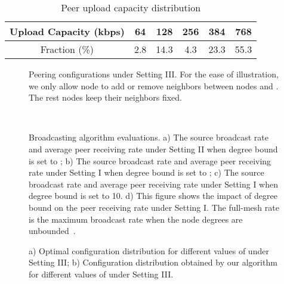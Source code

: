 \documentclass[10pt,conference]{IEEEtran}
\begin{document}
\begin{table}
\caption{Peer upload capacity distribution}


\label{tab:distrib}

\centering{}\begin{tabular}{|c|c|c|c|c|c|}
\hline
Upload Capacity (kbps)  & 64  & 128  & 256  & 384  & 768 \tabularnewline
\hline
Fraction (\%)  & 2.8  & 14.3  & 4.3  & 23.3  & 55.3 \tabularnewline
\hline
\end{tabular}
\end{table}

\begin{figure}[hbt!]
\centering
{}
\caption{Peering configurations under Setting III. For the ease of illustration, we only allow node  to add or remove neighbors between nodes  and . The rest nodes keep their neighbors fixed.}
\label{fig:4_config}
\end{figure}

\begin{figure*}[hbt!]
\centering \mbox{ 
} \\
 \caption{Broadcasting algorithm evaluations. a) The source
broadcast rate and average peer receiving rate under Setting II when degree bound is set to ; b) The source broadcast rate and average peer receiving rate under Setting I when degree bound is set to ; c) The source broadcast rate and average peer receiving rate under Setting I when degree bound is set to 10. d) This figure shows the impact of degree bound on the peer receiving rate under Setting I. The full-mesh rate is the maximum broadcast rate when the node degrees are unbounded~\cite{all:Mutualcast:LPZ05}.}
\label{fig:bp}
\end{figure*}

\begin{figure}[hbt!]
\centering
{}
\caption{a) Optimal configuration distribution for different values of  under Setting III; b) Configuration distribution obtained by our algorithm for different values of  under Setting III.}
\end{figure}
\end{document}
